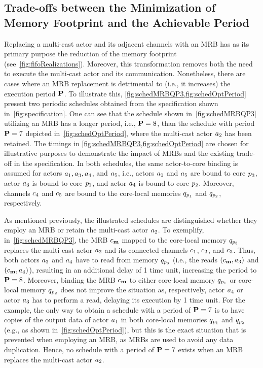 \subsection{Trade-offs between the Minimization of Memory Footprint and the Achievable Period}\label{sec:MFvsPeriod}

Replacing a multi-cast actor and its adjacent channels with an \ac{MRB} has as its primary purpose the reduction of the memory footprint (see~\cref{fig:fifoRealizations}).
Moreover, this transformation removes both the need to execute the multi-cast actor and its communication.
Nonetheless, there are cases where an \ac{MRB} replacement is detrimental to (i.e., it increases) the execution period $\mathbf{P}$.
To illustrate this, \cref{fig:schedMRBQP3,fig:schedOptPeriod} present two periodic schedules obtained from the specification shown in~\cref{fig:specification}.
One can see that the schedule shown in~\cref{fig:schedMRBQP3} utilizing an \ac{MRB} has a longer period, i.e., $\mathbf{P} = 8$, than the schedule with period $\mathbf{P} = 7$ depicted in~\cref{fig:schedOptPeriod}, where the multi-cast actor $a_2$ has been retained.
The timings in \cref{fig:schedMRBQP3,fig:schedOptPeriod} are chosen for illustrative purposes to demonstrate the impact of \acp{MRB} and the existing trade-off in the specification.
In both schedules, the same actor-to-core binding is assumed for actors $a_1, a_3, a_4$, and $a_5$, i.e., actors $a_1$ and $a_5$ are bound to core $p_3$, actor $a_3$ is bound to core $p_1$, and actor $a_4$ is bound to core $p_2$.
Moreover, channels $c_4$ and $c_5$ are bound to the core-local memories $q_{p_1}$ and $q_{p_2}$, respectively.

As mentioned previously, the illustrated schedules are distinguished whether they employ an \ac{MRB} or retain the multi-cast actor $a_2$.
To exemplify, in~\cref{fig:schedMRBQP3}, the \ac{MRB} $\GenMRB$ mapped to the core-local memory $q_{p_3}$ replaces the multi-cast actor $a_2$ and its connected channels $c_1$, $c_2$, and $c_3$.
Thus, both actors $a_3$ and $a_4$ have to read from memory $q_{p_3}$ (i.e., the reads $(\GenMRB,\actor_3)$ and $(\GenMRB,\actor_4)$), resulting in an additional delay of 1 time unit, increasing the period to $\mathbf{P} = 8$.
Moreover, binding the \ac{MRB} $\GenMRB$ to either core-local memory $q_{p_1}$ or core-local memory $q_{p_2}$ does not improve the situation as, respectively, actor $a_4$ or actor $a_3$ has to perform a read, delaying its execution by 1 time unit.
For the example, the only way to obtain a schedule with a period of $\mathbf{P} = 7$ is to have copies of the output data of actor $a_1$ in both core-local memories $q_{p_1}$ and $q_{p_2}$ (e.g., as shown in~\cref{fig:schedOptPeriod}), but this is the exact situation that is prevented when employing an \ac{MRB}, as \acp{MRB} are used to avoid any data duplication.
Hence, no schedule with a period of $\mathbf{P} = 7$ exists when an \ac{MRB} replaces the multi-cast actor $a_2$.

